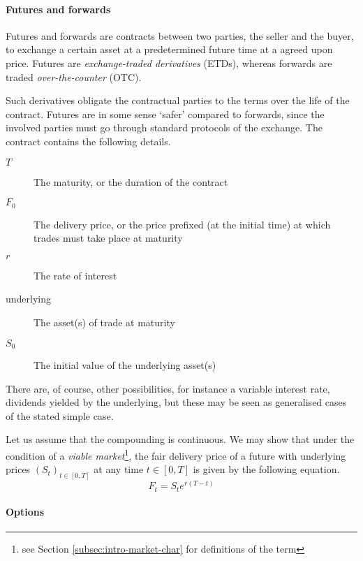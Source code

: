 \paragraph{Futures and forwards}

\begin{dfn}
	Futures and forwards are contracts between two parties, the seller and the buyer, to exchange a certain asset at a predetermined future time at a agreed upon price. Futures are \emph{exchange-traded derivatives} (ETDs), whereas forwards are traded \emph{over-the-counter} (OTC).
\end{dfn}

Such derivatives obligate the contractual parties to the terms over the life of the contract. Futures are in some sense `safer' compared to forwards, since the involved parties must go through standard protocols of the exchange.
The contract contains the following details.
\begin{description}
	\item[$ T $] The maturity, or the duration of the contract
	\item[$ F_0 $] The delivery price, or the price prefixed (at the initial time) at which trades must take place at maturity
	\item[$ r $] The rate of interest
	\item[underlying] The asset(s) of trade at maturity
	\item[$ S_0 $] The initial value of the underlying asset(s)
\end{description}
There are, of course, other possibilities, for instance a variable interest rate, dividends yielded by the underlying, but these may be seen as generalised cases of the stated simple case.

Let us assume that the compounding is continuous. We may show that under the condition of a \emph{viable market}\footnote{see Section \ref{subsec:intro-market-char} for definitions of the term}, the fair delivery price of a future with underlying prices $ ( S_t )_{t \in [0, T] } $ at any time $ t \in [0, T] $ is given by the following equation.
\begin{equation}
	\label{eq:intro-future-pr}
	F_t = S_t e^{ r (T - t) }
\end{equation}


\paragraph{Options}

